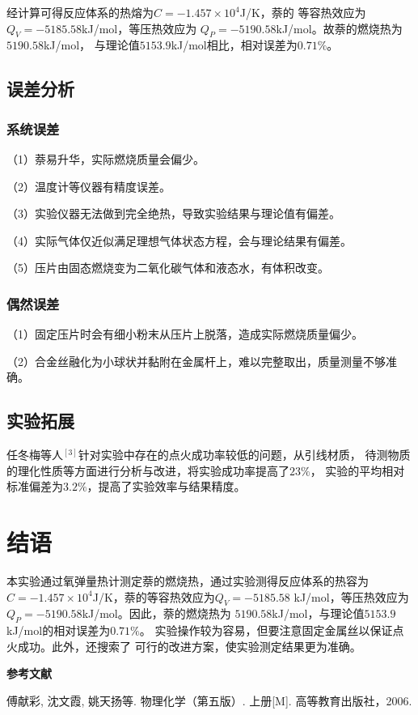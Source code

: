 \documentclass[12pt]{ctexart}
\numberwithin{equation}{section}
\begin{document}
经计算可得反应体系的热熔为$C = -1.457\times 10^4$J/K，萘的
等容热效应为$Q_V = -5185.58$kJ/mol，等压热效应为
$Q_P = -5190.58$kJ/mol。故萘的燃烧热为$5190.58$kJ/mol，
与理论值$5153.9$kJ/mol相比，相对误差为$0.71\%$。

\subsection{误差分析}
\subsubsection{系统误差}
（1）萘易升华，实际燃烧质量会偏少。

（2）温度计等仪器有精度误差。

（3）实验仪器无法做到完全绝热，导致实验结果与理论值有偏差。

（4）实际气体仅近似满足理想气体状态方程，会与理论结果有偏差。

（5）压片由固态燃烧变为二氧化碳气体和液态水，有体积改变。

\subsubsection{偶然误差}
（1）固定压片时会有细小粉末从压片上脱落，造成实际燃烧质量偏少。

（2）合金丝融化为小球状并黏附在金属杆上，难以完整取出，质量测量不够准确。

\subsection{实验拓展}
任冬梅等人$^{[3]}$针对实验中存在的点火成功率较低的问题，从引线材质，
待测物质的理化性质等方面进行分析与改进，将实验成功率提高了$23\%$，
实验的平均相对标准偏差为$3.2\%$，提高了实验效率与结果精度。

\section{结语}
本实验通过氧弹量热计测定萘的燃烧热，通过实验测得反应体系的热容为
$C = -1.457\times 10^4$J/K，萘的等容热效应为$Q_V = -5185.58$
kJ/mol，等压热效应为$Q_P = -5190.58$kJ/mol。因此，萘的燃烧热为
$5190.58$kJ/mol，与理论值$5153.9$kJ/mol的相对误差为$0.71\%$。
实验操作较为容易，但要注意固定金属丝以保证点火成功。此外，还搜索了
可行的改进方案，使实验测定结果更为准确。

\begin{center}
    \Large\bfseries{参考文献}
\end{center}
\noindent
[1] 傅献彩, 沈文霞, 姚天扬等. 物理化学（第五版）. 上册[M]. 高等教育出版社，2006.
\end{document}
